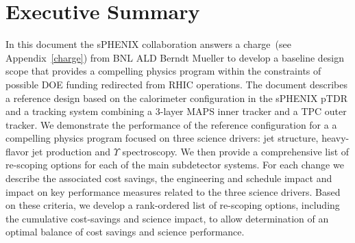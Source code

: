 \section*{Executive Summary}
\label{executive_summary}
\setcounter{page}{1}

\nocite{*}

In this document the sPHENIX collaboration answers a charge~(see
Appendix~\ref{charge}) from BNL ALD Berndt Mueller to develop
a baseline design scope that provides a compelling physics program
within the constraints of possible DOE funding redirected from 
RHIC operations. The document describes a reference design based
on the calorimeter configuration in the sPHENIX pTDR and a tracking system
combining a 3-layer MAPS inner tracker and a TPC outer tracker. We
demonstrate the performance of the reference configuration for a
a compelling physics program focused on three science drivers: jet structure,
heavy-flavor jet production and $\Upsilon$ spectroscopy. 
We then provide a comprehensive list of re-scoping options for each
of the main subdetector systems. For each change we describe the associated
cost savings, the engineering and schedule impact and impact on 
key performance measures related to the three science 
drivers. Based on these criteria, we develop a 
rank-ordered list of re-scoping options, including the 
cumulative cost-savings and science impact, to allow determination
of an optimal balance of cost savings and science performance.


